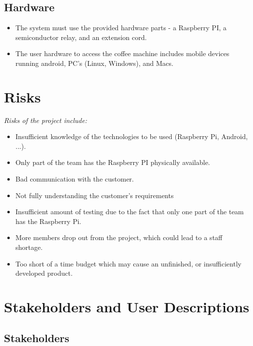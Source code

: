 \subsection{Hardware}

\begin{itemize}
\item The system must use the provided hardware parts - a Raspberry PI, a semiconductor relay, and an extension cord.
\item The user hardware to access the coffee machine includes mobile devices running android, PC's (Linux, Windows), and Macs. %
\end{itemize}

\section{Risks}

\textit{Risks of the project include:}

\begin{itemize}

\item Insufficient knowledge of the technologies to be used (Raspberry Pi,
Android, ...).
\item Only part of the team has the Raspberry PI physically available.
\item Bad communication with the customer.
\item Not fully understanding the customer's requirements
\item Insufficient amount of testing due to the fact that only one part of the team has the Raspberry Pi.
\item More members drop out from the project, which could lead to a staff shortage.
\item Too short of a time budget which may cause an unfinished, or insufficiently developed product.
\end{itemize}

\clearpage

\section{Stakeholders and User Descriptions}

\subsection{Stakeholders}

